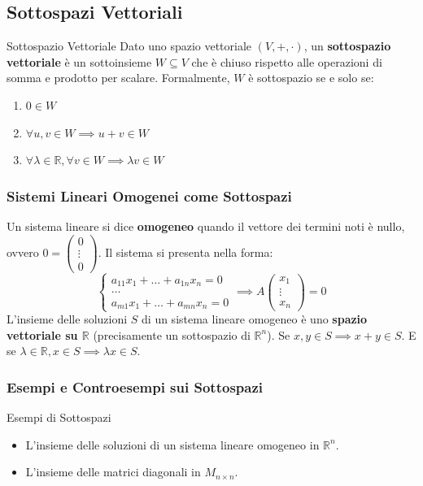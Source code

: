 \documentclass[11pt,a4paper]{article}
\begin{document}
\subsection{Sottospazi Vettoriali}
\begin{definition}{Sottospazio Vettoriale}{}
Dato uno spazio vettoriale $(V, +, \cdot)$, un \textbf{sottospazio vettoriale} è un sottoinsieme $W \subseteq V$ che è chiuso rispetto alle operazioni di somma e prodotto per scalare.
Formalmente, $W$ è sottospazio se e solo se:
\begin{enumerate}
    \item $0 \in W$
    \item $\forall u, v \in W \implies u+v \in W$
    \item $\forall \lambda \in \mathbb{R}, \forall v \in W \implies \lambda v \in W$
\end{enumerate}
\end{definition}

\subsubsection{Sistemi Lineari Omogenei come Sottospazi}
Un sistema lineare si dice \textbf{omogeneo} quando il vettore dei termini noti è nullo, ovvero $0 = \begin{pmatrix} 0 \\ \vdots \\ 0 \end{pmatrix}$.
Il sistema si presenta nella forma:
$$ \begin{cases} a_{11}x_1 + \dots + a_{1n}x_n = 0 \\ \dots \\ a_{m1}x_1 + \dots + a_{mn}x_n = 0 \end{cases} \implies A\begin{pmatrix} x_1 \\ \vdots \\ x_n \end{pmatrix} = 0 $$
L'insieme delle soluzioni $S$ di un sistema lineare omogeneo è uno \textbf{spazio vettoriale su $\mathbb{R}$} (precisamente un sottospazio di $\mathbb{R}^n$).
Se $x, y \in S \implies x+y \in S$. E se $\lambda \in \mathbb{R}, x \in S \implies \lambda x \in S$.

\subsubsection{Esempi e Controesempi sui Sottospazi}
\begin{example}{Esempi di Sottospazi}{}
\begin{itemize}
    \item L'insieme delle soluzioni di un sistema lineare omogeneo in $\mathbb{R}^n$.
    \item L'insieme delle matrici diagonali in $M_{n \times n}$.
\end{itemize}
\end{example}
\end{document}

